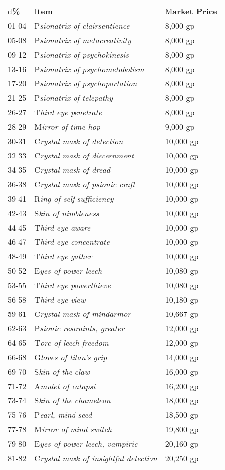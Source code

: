 \documentclass{article}
\begin{document}
\vspace{12pt}
\begin{tabular}{|>{\raggedright}p{28pt}|>{\raggedright}p{141pt}|>{\raggedright}p{55pt}|}
\hline
\multicolumn{3}{|p{225pt}|}{T\textbf{able: Medium Universal Items}}\tabularnewline
\hline
d\textbf{\%} & I\textbf{tem} & M\textbf{arket Price}\tabularnewline
\hline
01-04 & P\textit{sionatrix of clairsentience} & 8,000 gp\tabularnewline
\hline
05-08 & P\textit{sionatrix of metacreativity} & 8,000 gp\tabularnewline
\hline
09-12 & P\textit{sionatrix of psychokinesis} & 8,000 gp\tabularnewline
\hline
13-16 & P\textit{sionatrix of psychometabolism} & 8,000 gp\tabularnewline
\hline
17-20 & P\textit{sionatrix of psychoportation} & 8,000 gp\tabularnewline
\hline
21-25 & P\textit{sionatrix of telepathy} & 8,000 gp\tabularnewline
\hline
26-27 & T\textit{hird eye penetrate} & 8,000 gp\tabularnewline
\hline
28-29 & M\textit{irror of time hop} & 9,000 gp\tabularnewline
\hline
30-31 & C\textit{rystal mask of detection} & 10,000 gp\tabularnewline
\hline
32-33 & C\textit{rystal mask of discernment} & 10,000 gp\tabularnewline
\hline
34-35 & C\textit{rystal mask of dread} & 10,000 gp\tabularnewline
\hline
36-38 & C\textit{rystal mask of psionic craft} & 10,000 gp\tabularnewline
\hline
39-41 & R\textit{ing of self-sufficiency} & 10,000 gp\tabularnewline
\hline
42-43 & S\textit{kin of nimbleness} & 10,000 gp\tabularnewline
\hline
44-45 & T\textit{hird eye aware} & 10,000 gp\tabularnewline
\hline
46-47 & T\textit{hird eye concentrate} & 10,000 gp\tabularnewline
\hline
48-49 & T\textit{hird eye gather} & 10,000 gp\tabularnewline
\hline
50-52 & E\textit{yes of power leech} & 10,080 gp\tabularnewline
\hline
53-55 & T\textit{hird eye powerthieve} & 10,080 gp\tabularnewline
\hline
56-58 & T\textit{hird eye view} & 10,180 gp\tabularnewline
\hline
59-61 & C\textit{rystal mask of mindarmor} & 10,667 gp\tabularnewline
\hline
62-63 & P\textit{sionic restraints, greater} & 12,000 gp\tabularnewline
\hline
64-65 & T\textit{orc of leech freedom} & 12,000 gp\tabularnewline
\hline
66-68 & G\textit{loves of titan's grip} & 14,000 gp\tabularnewline
\hline
69-70 & S\textit{kin of the claw} & 16,000 gp\tabularnewline
\hline
71-72 & A\textit{mulet of catapsi} & 16,200 gp\tabularnewline
\hline
73-74 & S\textit{kin of the chameleon} & 18,000 gp\tabularnewline
\hline
75-76 & P\textit{earl, mind seed} & 18,500 gp\tabularnewline
\hline
77-78 & M\textit{irror of mind switch} & 19,800 gp\tabularnewline
\hline
79-80 & E\textit{yes of power leech, vampiric} & 20,160 gp\tabularnewline
\hline
81-82 & C\textit{rystal mask of insightful detection} & 20,250 gp\tabularnewline

\end{tabular}
\end{document}
